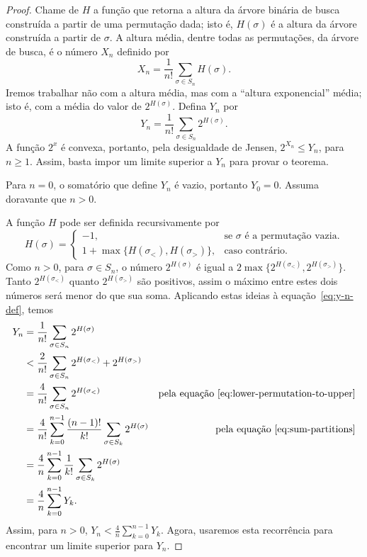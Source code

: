 \begin{proof}
    Chame de $H$ a função que retorna a altura da árvore binária de busca
    construída a partir de uma permutação dada;
    isto é, $H(\sigma)$ é a altura da árvore construída a partir de $\sigma$.
    A altura média,
    dentre todas as permutações,
    da árvore de busca,
    é o número $X_n$ definido por
    \begin{equation*}
        X_n = \frac{1}{n!} \sum_{\sigma \in S_n} H(\sigma).
    \end{equation*}
    Iremos trabalhar não com a altura média,
    mas com a ``altura exponencial'' média;
    isto é, com a média do valor de $2^{H(\sigma)}$.
    Defina $Y_n$ por
    \begin{equation}
        Y_n = \frac{1}{n!} \sum_{\sigma \in S_n} 2^{H(\sigma)}.
        \label{eq:y-n-def}
    \end{equation}
    A função $2^x$ é convexa,
    portanto,
    pela desigualdade de Jensen,
    $2^{X_n} \leq Y_n$,
    para $n \geq 1$.
    Assim, basta impor um limite superior a $Y_n$ para provar o teorema.

    Para $n = 0$, o somatório que define $Y_n$ é vazio,
    portanto $Y_0 = 0$.
    Assuma doravante que $n > 0$.

    A função $H$ pode ser definida recursivamente por
    \begin{equation*}
        H(\sigma) = \begin{cases}
            -1, & \text{se $\sigma$ é a permutação vazia.} \\
            1 + \max\{H(\sigma_<), H(\sigma_>)\}, & \text{caso contrário.}
        \end{cases}
    \end{equation*}
    Como $n > 0$, para $\sigma \in S_n$,
    o número $2^{H(\sigma)}$ é igual a $2 \max\{2^{H(\sigma_<)}, 2^{H(\sigma_>)}\}$.
    Tanto $2^{H(\sigma_<)}$ quanto $2^{H(\sigma_>)}$ são positivos,
    assim o máximo entre estes dois números será menor do que sua soma.
    Aplicando estas ideias à equação~\ref{eq:y-n-def},
    temos
    \begin{align*}
        Y_n &= \frac{1}{n!} \sum_{\sigma \in S_n} 2^{H(\sigma)} \\
            &< \frac{2}{n!} \sum_{\sigma \in S_n} 2^{H(\sigma_<)} + 2^{H(\sigma_>)} \\
            &= \frac{4}{n!} \sum_{\sigma \in S_n} 2^{H(\sigma_<)}
        &\text{pela equação~\ref{eq:lower-permutation-to-upper}} \\
        &= \frac{4}{n!} \sum_{k = 0}^{n-1}
            \frac{(n-1)!}{k!} \sum_{\sigma \in S_k} 2^{H(\sigma)}
            &\text{pela equação~\ref{eq:sum-partitions}} \\
        &= \frac{4}{n} \sum_{k = 0}^{n-1}
            \frac{1}{k!} \sum_{\sigma \in S_k} 2^{H(\sigma)} \\
        &= \frac 4 n \sum_{k = 0}^{n-1} Y_k.
    \end{align*}
    Assim, para $n > 0$, $Y_n < \frac 4 n \sum_{k = 0}^{n-1} Y_k$.
    Agora, usaremos esta recorrência para encontrar um limite superior para $Y_n$.


\end{proof}
